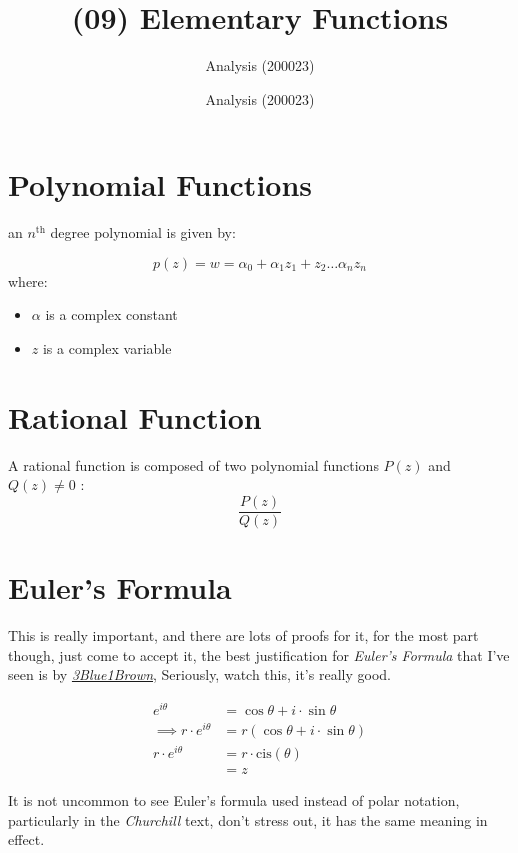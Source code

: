 \documentclass[class=article, crop=false]{standalone}
\title{(09) Elementary Functions}
\date{Analysis (200023)}
\author{Analysis (200023)}
\begin{document}

\section{Polynomial Functions}
    an $n^{\mathrm{th}}$ degree polynomial is given by:

    \[
      p\left( z \right)  =  w =  \alpha_0 +  \alpha_1z_1+  z_2 \dots \alpha_nz_n
    \]
        where:
    \begin{itemize}
      \item $\alpha$ is a complex constant
      \item $z$ is a complex variable
    \end{itemize}

    \section{Rational Function}
    A rational function is composed of two polynomial functions $P\left( z \right) $ and $Q\left( z \right) \neq 0$ :
    \[
      \frac{P\left( z \right) }{Q\left( z \right) }
    \]


\newpage


    \section{Euler's Formula}
    This is really important, and there are lots of proofs for it, for the most part though, just come to accept it, the best justification for \textit{Euler's Formula} that I've seen is by \href{https://www.youtube.com/watch?v=mvmuCPvRoWQ}{\textit{3Blue1Brown}}, Seriously, watch this, it's really good.

    \begin{align*}
      e^{i\theta} &=  \cos{\theta} +  i \cdot  \sin{\theta} \\
      \implies   r \cdot e^{i\theta} &= r \left( \cos{\theta} +  i \cdot  \sin{\theta} \right) \\
      r \cdot  e^{i\theta} &=  r \cdot  \mathrm{cis}{\left( \theta \right) } \\
      &= z
    \end{align*}

    It is not uncommon to see Euler's formula used instead of polar notation, particularly in the \textit{Churchill} text, don't stress out, it has the same meaning in effect.
\end{document}
